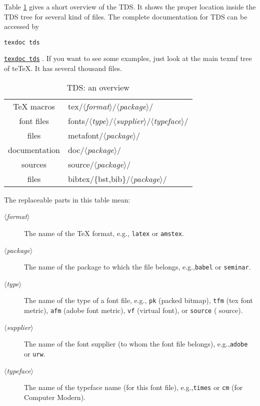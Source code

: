 \documentclass[11pt,a4paper]{article}
\newif\ifpdfoutput
\newcommand{\pdfext}{pdf}
\newcommand{\dviext}{dvi}
\newcommand{\dlink}[3]{%
  \ifpdfoutput
    \ifx\pdfext#3
      \href{#1/#2.#3}{\texttt{texdoc #2}}%
    \else
      \texttt{texdoc #2}%
    \fi
  \else
     \href{#1/#2.#3}{\mbox{\texttt{texdoc #2}}}%
  \fi}
\newcommand{\teTeX}{\textrm{te}\TeX\xspace}
\begin{document}
\def\replaceable#1{{\rmfamily $\langle$\textit{#1}$\rangle$}} Table
\ref{tab:tds} gives a short overview of the TDS. It shows the proper
location inside the TDS tree for several kind of files. The complete
documentation for TDS can be accessed by
\dlink{../help}{tds}{\dviext}. If you want to see some examples, just
look at the main texmf tree of \teTeX. It has several thousand
files.\bigskip

\begin{table}[htbp]
  \begin{center}
    \begin{tabular}{cl}
      \toprule
      \TeX{} macros & tex/\replaceable{format}/\replaceable{package}/\\
      font files &  
fonts/\replaceable{type}/\replaceable{supplier}/\replaceable{typeface}/ \\
      \MF{} files & metafont/\replaceable{package}/ \\
      documentation & doc/\replaceable{package}/ \\
      sources & source/\replaceable{package}/\\
      \BibTeX{} files & bibtex/\{bst,bib\}/\replaceable{package}/\\
      \bottomrule
    \end{tabular}
    \caption{TDS: an overview}
    \label{tab:tds}
  \end{center}
\end{table}

The replaceable parts in this table mean:
\begin{description}
\item[\replaceable{format}] The name of the \TeX{} format, e.g.,\@
  \texttt{latex} or \texttt{amstex}.
\item[\replaceable{package}] The name of the package to which the file
  belongs, e.g.,\@ \texttt{babel} or \texttt{seminar}.
\item[\replaceable{type}] The name of the type of a font file, e.g.,\@
  \texttt{pk} (packed bitmap), \texttt{tfm} (tex font metric),
  \texttt{afm} (adobe font metric), \texttt{vf} (virtual font),
  or \texttt{source} (\MF{} source).
\item[\replaceable{supplier}] The name of the font supplier (to whom
  the font file belongs), e.g.,\@ \texttt{adobe} or \texttt{urw}.
\item[\replaceable{typeface}] The name of the typeface name (for this
  font file), e.g.,\@ \texttt{times} or \texttt{cm} (for Computer
  Modern).
\end{description}
\end{document}
